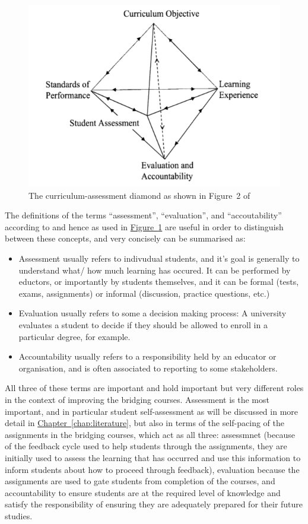 \documentclass[twoside,12pt,a4paper]{report}
\newcommand{\refchap}[1]{\hyperref[chap:#1]{Chapter~\ref{chap:#1}}}
\newcommand{\reffig}[1]{\hyperref[fig:#1]{Figure~\ref{fig:#1}}}
\begin{document}
\begin{figure}[ht]
\centering
\includegraphics{./figures/curriculum-assessment-model.PNG}
\caption{The curriculum-assessment diamond as shown in Figure~2 of \protect{} \label{fig:diamond}}
\end{figure}

The definitions of the terms ``assessment'', ``evaluation'', and ``accoutability'' according to  and hence as used in \reffig{diamond} are useful in order to distinguish between these concepts, and very concisely can be summarised as:
\begin{itemize}
	\item Assessment usually refers to indivudual students, and it's goal is generally to understand what/ how much learning has occured. It can be performed by eductors, or importantly by students themselves, and it can be formal (tests, exams, assignments) or informal (discussion, practice questions, etc.)
	\item Evaluation usually refers to some a decision making process: A university evaluates a student to decide if they should be allowed to enroll in a particular degree, for example.
	\item Accountability usually refers to a responsibility held by an educator or organisation, and is often associated to reporting to some stakeholders. 
\end{itemize}
All three of these terms are important and hold important but very different roles in the context of improving the bridging courses. Assessment is the most important, and in particular student self-assessment as will be discussed in more detail in \refchap{literature}, but also in terms of the self-pacing of the assignments in the bridging courses, which act as all three: assessmnet (because of the feedback cycle used to help students through the assignments, they are initially used to assess the learning that has occurred and use this information to inform students about how to proceed through feedback), evaluation because the assignments are used to gate students from completion of the courses, and accountability to ensure students are at the required level of knowledge and satisfy the responsibility of ensuring they are adequately prepared for their future studies. 
\end{document}
